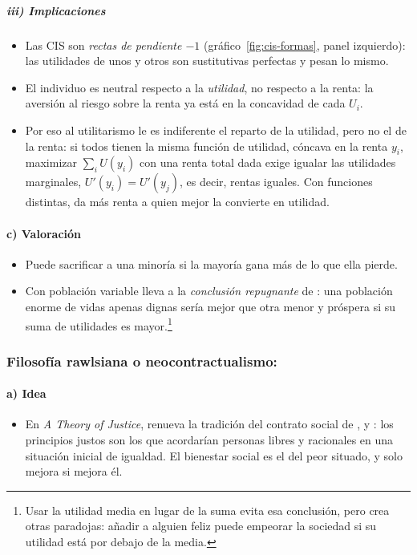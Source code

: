 \documentclass[11pt]{article}
\begin{document}
\subparagraph{iii) Implicaciones}

\begin{itemize}
\item Las CIS son \emph{rectas de pendiente $-1$} (gráfico~\ref{fig:cis-formas}, panel izquierdo): las utilidades de unos y otros son sustitutivas perfectas y pesan lo mismo.
\item El individuo es neutral respecto a la \emph{utilidad}, no respecto a la renta: la aversión al riesgo sobre la renta ya está en la concavidad de cada $U_i$.
\item Por eso al utilitarismo le es indiferente el reparto de la utilidad, pero no el de la renta: si todos tienen la misma función de utilidad, cóncava en la renta $y_i$, maximizar $\sum_iU(y_i)$ con una renta total dada exige igualar las utilidades marginales, $U'(y_i)=U'(y_j)$, es decir, rentas iguales\nocite{Edgeworth1897Pure}. Con funciones distintas, da más renta a quien mejor la convierte en utilidad.
\end{itemize}

\paragraph{c) Valoración}

\begin{itemize}
\item Puede sacrificar a una minoría si la mayoría gana más de lo que ella pierde.
\item Con población variable lleva a la \emph{conclusión repugnante} de \textcite{Parfit1984Reasons}: una población enorme de vidas apenas dignas sería mejor que otra menor y próspera si su suma de utilidades es mayor.\footnote{Usar la utilidad media en lugar de la suma evita esa conclusión, pero crea otras paradojas: añadir a alguien feliz puede empeorar la sociedad si su utilidad está por debajo de la media.}
\end{itemize}

\subsubsection{Filosofía rawlsiana o neocontractualismo: }\label{sec:rawls}

\paragraph{a) Idea}

\begin{itemize}
\item En \emph{A Theory of Justice}, \textcite{Rawls1971Theory} renueva la tradición del contrato social de ,  y : los principios justos son los que acordarían personas libres y racionales en una situación inicial de igualdad. El bienestar social es el del peor situado, y solo mejora si mejora él.
\end{itemize}
\end{document}
